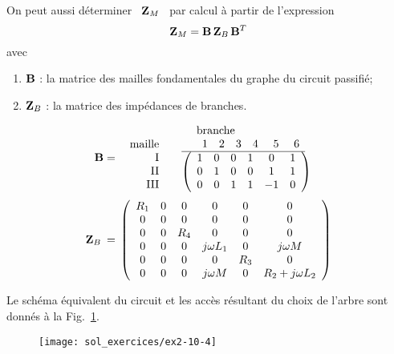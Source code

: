 On peut aussi déterminer  \ ${\bf Z}_M$ \ par calcul à partir de l'expression
\[ {\bf Z}_M = {\bf B} \, {\bf Z}_B \, {\bf B}^T \]
avec\\
\begin{enumerate}
	\item ${\bf B}$ :  la matrice des mailles fondamentales  du graphe du circuit passifié;
	\item ${\bf Z}_B$ :  la matrice des impédances de branches.
\end{enumerate}
\[ {\bf B} =   
\begin{array}[b]{rl}
\begin{array}{r} \\ \mbox{maille} \\ \mbox{I} \\ \mbox{II} \\ \mbox{III} \end{array} & 
\begin{array}{l}
\mbox{~~~~branche}\\
\begin{array}{cccccc}
~~~~1 & 2 & 3 & 4 & ~5 & ~6 \\\hline
\end{array}\\
\left( \begin{array}{cccccc}
1 & 0 & 0 & 1 & 0 & 1\\
0 & 1 & 0 & 0 & 1 & 1\\
0 & 0 & 1 & 1 & -1 & 0
\end{array}\right)
\end{array}
\end{array}\]
\[ {\bf Z}_B \: = \, \left( \begin{array}{cccccc}
R_1 & 0 & 0 & 0 & 0 & 0\\
0 & 0 & 0 & 0 & 0 & 0\\
0 & 0 & R_4 & 0 & 0 & 0\\
0 & 0 & 0 & j\omega L_1 & 0 & j\omega M\\
0 & 0 & 0 & 0 & R_3 & 0\\
0 & 0 & 0 & j\omega M & 0 & R_2 + j\omega L_2
\end{array} \right) \]



Le schéma équivalent du circuit et les accès résultant du choix de
l'arbre sont donnés à la Fig.~\ref{ex2-10-4s}.
\begin{figure}[h]
	\begin{center}
		\texttt{[image: sol\_exercices/ex2-10-4]}
		\caption{}\label{ex2-10-4s}
	\end{center}
\end{figure}

